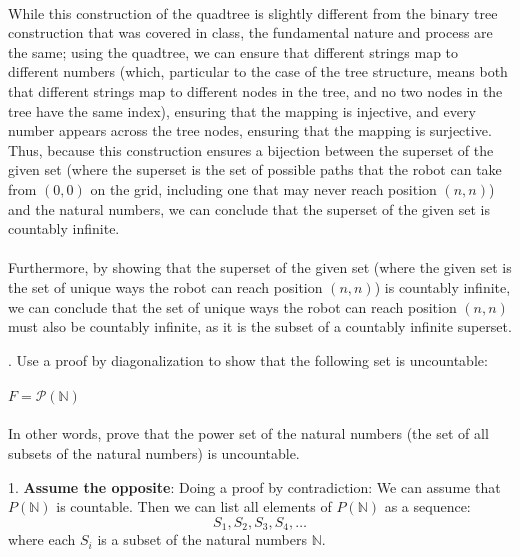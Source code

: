 \documentclass[12pt]{article}
\newcounter{quesnum}
\newcommand{\question}[2][??]{
\begin{list}{\labelitemi}{\leftmargin=2em}
\item [\arabic{quesnum}.] {} {#2}
\end{list}
\addtocounter{quesnum}{1}
}
\begin{document}
{\begin{enumerate}
\\
While this construction of the quadtree is slightly different from the binary tree construction that was covered in class, the fundamental nature and process are the same; using the quadtree, we can ensure that different strings map to different numbers (which, particular to the case of the tree structure, means both that different strings map to different nodes in the tree, and no two nodes in the tree have the same index), ensuring that the mapping is injective, and every number appears across the tree nodes, ensuring that the mapping is surjective. Thus, because this construction ensures a bijection between the superset of the given set (where the superset is the set of possible paths that the robot can take from $(0, 0)$ on the grid, including one that may never reach position $(n,n)$) and the natural numbers, we can conclude that the superset of the given set is countably infinite.\\
\\
Furthermore, by showing that the superset of the given set (where the given set is the set of unique ways the robot can reach position $(n,n)$) is countably infinite, we can conclude that the set of unique ways the robot can reach position $(n,n)$ must also be countably infinite, as it is the subset of a countably infinite superset.
 
\end{enumerate}
}



\vspace{12pt}

\question[3]{
Use a proof by diagonalization to show that the following set is uncountable:\\
\\
$F= \mathcal{P}(\mathbb{N}) $
\\
\\
In other words, prove that the power set of the natural numbers (the set of all subsets of the natural numbers) is uncountable.
}

1. \textbf{Assume the opposite}: Doing a proof by contradiction: We can assume that \( P(\mathbb{N}) \) is countable. Then we can list all elements of \( P(\mathbb{N}) \)  as a sequence:
   \[
   S_1, S_2, S_3, S_4, \dots
   \]
   where each \( S_i \) is a subset of the natural numbers \( \mathbb{N} \).\newline
\end{document}
